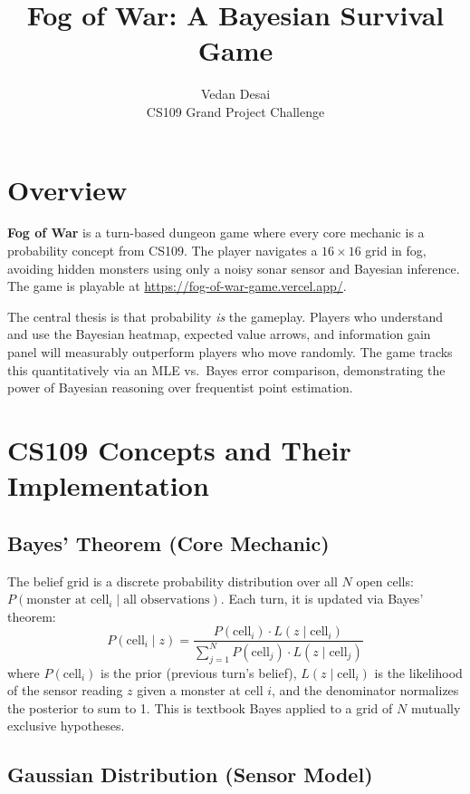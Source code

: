 \documentclass[11pt]{article}
\title{\vspace{-1.5cm}\textbf{Fog of War: A Bayesian Survival Game}\vspace{-0.3cm}}
\author{Vedan Desai \\ CS109 Grand Project Challenge}
\date{}
\begin{document}
\maketitle
\vspace{-0.5cm}

\section{Overview}

\textbf{Fog of War} is a turn-based dungeon game where every core mechanic is a probability concept from CS109. The player navigates a $16 \times 16$ grid in fog, avoiding hidden monsters using only a noisy sonar sensor and Bayesian inference. The game is playable at \url{https://fog-of-war-game.vercel.app/}.

The central thesis is that probability \textit{is} the gameplay. Players who understand and use the Bayesian heatmap, expected value arrows, and information gain panel will measurably outperform players who move randomly. The game tracks this quantitatively via an MLE vs.\ Bayes error comparison, demonstrating the power of Bayesian reasoning over frequentist point estimation.

\section{CS109 Concepts and Their Implementation}

\subsection{Bayes' Theorem (Core Mechanic)}

The belief grid is a discrete probability distribution over all $N$ open cells: $P(\text{monster at cell}_i \mid \text{all observations})$. Each turn, it is updated via Bayes' theorem:
\[
P(\text{cell}_i \mid z) = \frac{P(\text{cell}_i) \cdot L(z \mid \text{cell}_i)}{\sum_{j=1}^{N} P(\text{cell}_j) \cdot L(z \mid \text{cell}_j)}
\]
where $P(\text{cell}_i)$ is the prior (previous turn's belief), $L(z \mid \text{cell}_i)$ is the likelihood of the sensor reading $z$ given a monster at cell $i$, and the denominator normalizes the posterior to sum to 1. This is textbook Bayes applied to a grid of $N$ mutually exclusive hypotheses.

\subsection{Gaussian Distribution (Sensor Model)}
\end{document}
